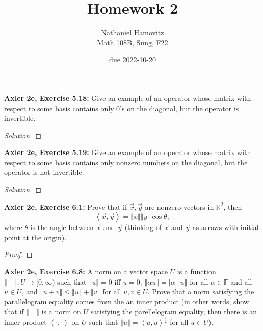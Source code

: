 \documentclass{article}
\newcommand{\R}{\mathbb{R}}
\newcommand{\F}{\mathbb{F}}
\newcommand{\abs}[1]{\left| #1 \right|}
\newcommand{\norm}[1]{\left\Vert #1 \right\Vert}
\newcommand{\iprod}[2]{\left\langle #1, #2 \right\rangle}
\begin{document}


\title{Homework 2} %
\author{Nathaniel Hamovitz\\Math 108B, Sung, F22}
\date{due 2022-10-20}

\maketitle



\textbf{Axler 2e, Exercise 5.18: }
Give an example of an operator whose matrix with respect to some basis contains only 0's on the diagonal, but the operator is invertible.

\begin{proof}[Solution]
    
\end{proof}


\newpage %


\textbf{Axler 2e, Exercise 5.19: }
Give an example of an operator whose matrix with respect to some basis contains only nonzero numbers on the diagonal, but the operator is not invertible. 


\begin{proof}[Solution]
    
\end{proof}

\newpage %


\textbf{Axler 2e, Exercise 6.1: }
Prove that if $\vec{x}, \vec{y}$ are nonzero vectors in $\R^2$, then
$$\iprod{\vec x}{\vec y} = \norm{x} \norm{y} \cos \theta,$$
where $\theta$ is the angle between $\vec x$ and $\vec y$ (thinking of $\vec x$ and $\vec y$ as arrows with initial point at the origin).

\begin{proof}
    
\end{proof}

\newpage %

\textbf{Axler 2e, Exercise 6.8: }
A norm on a vector space $U$ is a function $\norm{\quad}: \mathit{U} \mapsto [0, \infty)$ such that $\norm{u} = 0$ iff $u = 0$; $\norm{\alpha u} = \abs{\alpha} \norm{u}$ for all $\alpha \in \F$ and all $u \in \mathit{U}$, and $\norm{u + v} \le \norm{u} + \norm{v}$ for all $u, v \in \mathit{U}$. Prove that a norm satisfying the parallelogram equality comes from the an inner product (in other words, show that if $\norm{\quad}$ is a norm on $U$ satisfying the parellelogram equality, then there is an inner product $\iprod{\cdot}{\cdot}$ on $U$ such that $\norm{u} = \iprod{u}{u}^{\frac{1}{2}}$ for all $u \in U$).
\end{document}
